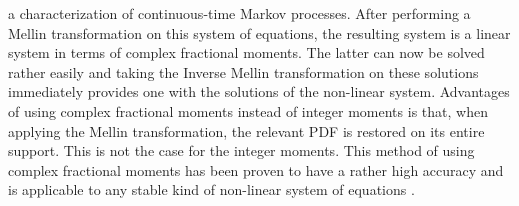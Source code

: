 a characterization of continuous-time Markov processes. After performing a Mellin transformation on this system of equations, the resulting system is a linear system in terms of complex fractional moments. The latter can now be solved rather easily and taking the Inverse Mellin transformation on these solutions immediately provides one with the solutions of the non-linear system. Advantages of using complex fractional moments instead of integer moments is that, when applying the Mellin transformation, the relevant PDF is restored on its entire support. This is not the case for the integer moments. This method of using complex fractional moments has been proven to have a rather high accuracy and is applicable to any stable kind of non-linear system of equations \cite{dimatteo2014}.